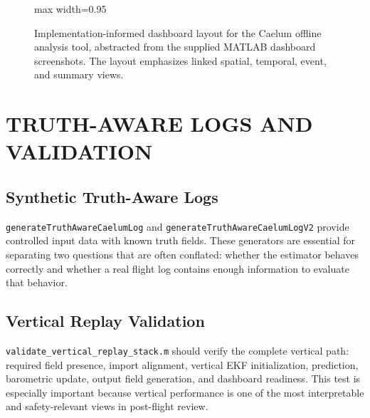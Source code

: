 \documentclass[colorlinks,upint,subscriptcorrection,varvw,hyphenate,balance]{asmeconf}
\newcommand{\code}[1]{\texttt{\allowbreak#1}}
\begin{document}
\begin{figure}[t]
\centering
\begin{adjustbox}{max width=0.95\columnwidth}
\end{adjustbox}
\caption{Implementation-informed dashboard layout for the Caelum offline analysis tool, abstracted from the supplied MATLAB dashboard screenshots. The layout emphasizes linked spatial, temporal, event, and summary views.}
\label{fig:dashboard}
\end{figure}

\section{TRUTH-AWARE LOGS AND VALIDATION}

\subsection{Synthetic Truth-Aware Logs}
\code{generateTruthAwareCaelumLog} and \code{generateTruthAwareCaelumLogV2} provide controlled input data with known truth fields. These generators are essential for separating two questions that are often conflated: whether the estimator behaves correctly and whether a real flight log contains enough information to evaluate that behavior.

\subsection{Vertical Replay Validation}
\code{validate\_vertical\_replay\_stack.m} should verify the complete vertical path: required field presence, import alignment, vertical EKF initialization, prediction, barometric update, output field generation, and dashboard readiness. This test is especially important because vertical performance is one of the most interpretable and safety-relevant views in post-flight review.
\end{document}
